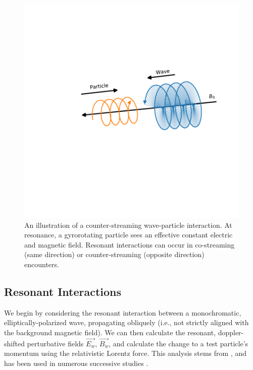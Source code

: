 \begin{figure}[h]
\begin{center}
\includegraphics{figures/resonant_interaction_cartoon.pdf}
\end{center}
\caption[Illustration of resonant wave-particle interactions]{An illustration of a counter-streaming wave-particle interaction. At resonance, a gyrorotating particle sees an effective constant electric and magnetic field. Resonant interactions can occur in co-streaming (same direction) or counter-streaming (opposite direction) encounters.}
\label{fig:resonant_interaction_cartoon}
\end{figure}

\subsection{Resonant Interactions}

We begin by considering the resonant interaction between a monochromatic, elliptically-polarized wave, propagating obliquely (i.e., not strictly aligned with the background magnetic field). We can then calculate the resonant, doppler-shifted perturbative fields $\vec{E_w}$, $\vec{B_w}$, and calculate the change to a test particle's momentum using the relativistic Lorentz force. This analysis stems from \cite{Bell1984}, and has been used in numerous successive studies \citep[][and others]{Ristic1993, Lauben1998, Bortnik2005}.

